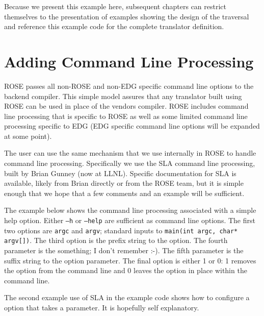 Because we present this example here, subsequent chapters can restrict themselves to
the presentation of examples showing the design of the traversal and reference this
example code for the complete translator definition.

\section{Adding Command Line Processing}

   ROSE passes all non-ROSE and non-EDG specific command line options to the backend
compiler.  This simple model assures that any translator built using ROSE can be used
in place of the vendors compiler. ROSE includes command line processing that is 
specific to ROSE as well as some limited command line processing specific to EDG
(EDG specific command line options will be expanded at some point).

   The user can use the same mechanism that we use internally in ROSE to handle command
line processing.  Specifically we use the SLA command line processing, built by Brian 
Gunney (now at LLNL).  Specific documentation for SLA is available, likely from Brian 
directly or from the ROSE team, but it is simple enough that we hope that a few comments and
an example will be sufficient.

   The example below shows the command line processing associated with a simple
help option.  Either {\tt --h} or {\tt --help} are sufficient as command line options.
The first two options are {\tt argc} and {\tt argv}; standard inputs to 
{\tt main(int argc, char* argv[])}.  The third option is the prefix string to the option.
The fourth parameter is the something; I don't remember :-).
The fifth parameter is the suffix string to the option parameter.
The final option is either 1 or 0: 1 removes the option from the command line and 0 leaves
the option in place within the command line.

The second example use of SLA in the example code shows how to configure a option that
takes a parameter. It is hopefully self explanatory.

